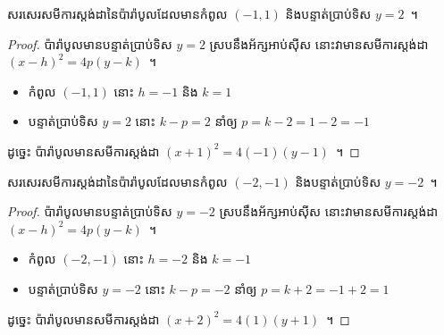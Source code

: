 %
\begin{example}
	សរសេរសមីការស្តង់ដានៃប៉ារ៉ាបូលដែលមានកំពូល $ (-1,1) $ និងបន្ទាត់ប្រាប់ទិស $ y=2 $~។
\end{example}
%
\begin{proof}
	ប៉ារ៉ាបូលមានបន្ទាត់ប្រាប់ទិស $ y=2 $ ស្របនឹងអ័ក្សអាប់ស៊ីស​ នោះវាមានសមីការស្តង់ដា $ (x-h)^2=4p(y-k) $~។
	\begin{itemize}
		\item កំពូល $ (-1,1) $ នោះ $ h=-1 $ និង $ k=1 $
		\item បន្ទាត់ប្រាប់ទិស $ y=2 $ នោះ $ k-p=2 $ នាំឲ្យ $ p=k-2=1-2=-1 $
	\end{itemize}
	ដូច្នេះ ប៉ារ៉ាបូលមានសមីការស្តង់ដា $ (x+1)^2=4(-1)(y-1) $~។
\end{proof}
%
\begin{example}
	សរសេរសមីការស្តង់ដានៃប៉ារ៉ាបូលដែលមានកំពូល $ (-2,-1) $ និងបន្ទាត់ប្រាប់ទិស $ y=-2 $~។
\end{example}
%
\begin{proof}
	ប៉ារ៉ាបូលមានបន្ទាត់ប្រាប់ទិស $ y=-2 $ ស្របនឹងអ័ក្សអាប់ស៊ីស​ នោះវាមានសមីការស្តង់ដា $ (x-h)^2=4p(y-k) $~។
	\begin{itemize}
		\item កំពូល $ (-2,-1) $ នោះ $ h=-2 $ និង $ k=-1 $
		\item បន្ទាត់ប្រាប់ទិស $ y=-2 $ នោះ $ k-p=-2 $ នាំឲ្យ $ p=k+2=-1+2=1 $
	\end{itemize}
	ដូច្នេះ ប៉ារ៉ាបូលមានសមីការស្តង់ដា $ (x+2)^2=4(1)(y+1) $~។
\end{proof}
%
